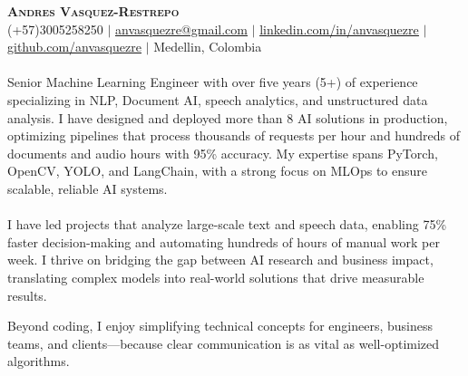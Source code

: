 \documentclass[letterpaper,11pt]{article}
\begin{document}

\begin{center}
  \textbf{\Huge \scshape Andres Vasquez-Restrepo} \\ \vspace{1pt}
  \small (+57)3005258250 $|$ \href{mailto:anvasquezre@gmail.com}{\underline{anvasquezre@gmail.com}} $|$
  \href{https://linkedin.com/in/anvasquezre}{\underline{linkedin.com/in/anvasquezre}} $|$
  \href{https://github.com/anvasquezre}{\underline{github.com/anvasquezre}} $|$ Medellin, Colombia

\end{center}

\paragraph{}
Senior Machine Learning Engineer with over five years (5+) of experience specializing
in NLP, Document AI, speech analytics, and unstructured data analysis. I have
designed and deployed more than 8 AI solutions in production, optimizing
pipelines that process thousands of requests per hour and hundreds of documents
and audio hours with 95\% accuracy. My expertise spans PyTorch, OpenCV, YOLO,
and LangChain, with a strong focus on MLOps to ensure scalable, reliable AI
systems.

\paragraph{}I have led projects that analyze large-scale text and speech data, enabling
75\% faster decision-making and automating hundreds of hours of manual work per
week. I thrive on bridging the gap between AI research and business impact,
translating complex models into real-world solutions that drive measurable
results.

Beyond coding, I enjoy simplifying technical concepts for engineers, business
teams, and clients—because clear communication is as vital as well-optimized
algorithms.
\end{document}
